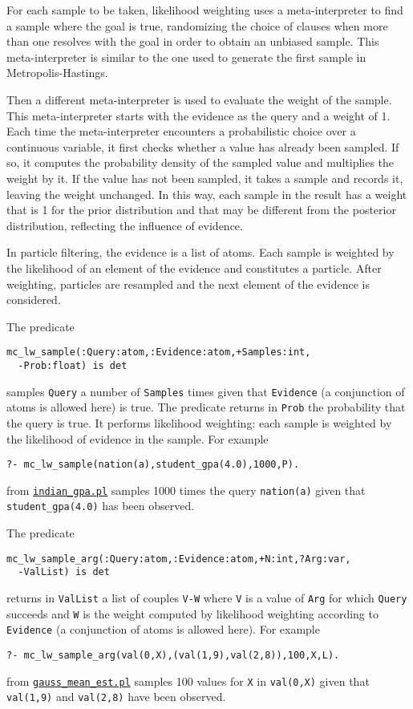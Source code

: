 For each sample to be taken, likelihood weighting
uses a meta-interpreter to find a sample where
the goal is true, randomizing the choice of
clauses when more than one resolves with the goal
in order to obtain an unbiased sample.
This meta-interpreter is similar to the one used
to generate the first sample in Metropolis-Hastings.

Then a different meta-interpreter is used to evaluate
the weight of the sample.
This meta-interpreter starts with the evidence as the query and a weight of 1. Each time the meta-interpreter encounters
a probabilistic choice over a continuous variable, it first checks whether a
value has already been sampled.
If so, it computes the probability density of the sampled value and multiplies the weight by it. If the value has not been sampled, it takes a sample and records it,
leaving the weight unchanged.
In this way, each sample in the result has a weight that is 1 for the prior distribution and that may be different from the posterior distribution,
reflecting the influence of evidence.

In particle filtering, the evidence is a list of atoms. Each sample is weighted by the
likelihood of an element of the evidence and constitutes a particle.
After weighting, particles are resampled and the next element of the evidence
is considered.

 The predicate
\begin{verbatim}
mc_lw_sample(:Query:atom,:Evidence:atom,+Samples:int,
  -Prob:float) is det
\end{verbatim}
samples \verb|Query|  a number of \verb|Samples| times given that \verb|Evidence|
(a conjunction of atoms is allowed here) is true.
The predicate returns in \verb|Prob| the probability that the query is true.
It performs likelihood weighting: each sample is weighted by the
likelihood of evidence in the sample.
For example
\begin{verbatim}
?- mc_lw_sample(nation(a),student_gpa(4.0),1000,P).
\end{verbatim}
from \href{http://cplint.eu/example/inference/indian_gpa.pl}{\texttt{indian\_gpa.pl}} samples 1000 times the query
\verb|nation(a)| given that \verb|student_gpa(4.0)| has been observed.


 The predicate
\begin{verbatim}
mc_lw_sample_arg(:Query:atom,:Evidence:atom,+N:int,?Arg:var,
  -ValList) is det
\end{verbatim}
returns in \verb|ValList| a list of couples \verb|V-W| where \verb|V| is a value of \verb|Arg|
for which \verb|Query| succeeds and \verb|W| is the
weight computed by likelihood weighting
according to \verb|Evidence| (a conjunction of atoms is allowed here).
For example
\begin{verbatim}
?- mc_lw_sample_arg(val(0,X),(val(1,9),val(2,8)),100,X,L).
\end{verbatim}
from \href{http://cplint.eu/example/inference/gauss_mean_est.pl}{\texttt{gauss\_mean\_est.pl}} samples 100 values for \verb|X| in
\verb|val(0,X)| given that \verb|val(1,9)| and \verb|val(2,8)| have been observed.

